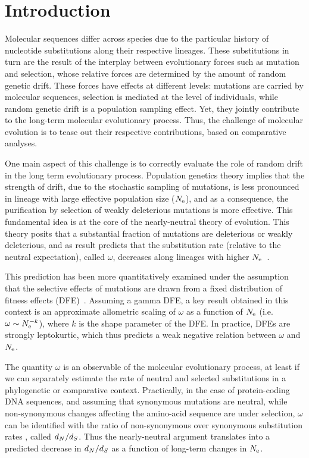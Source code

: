 \section{Introduction}

Molecular sequences differ across species due to the particular history of nucleotide substitutions along their respective lineages.
These substitutions in turn are the result of the interplay between evolutionary forces such as mutation and selection, whose relative forces are determined by the amount of random genetic drift.
These forces have effects at different levels: mutations are carried by molecular sequences, selection is mediated at the level of individuals, while random genetic drift is a population sampling effect.
Yet, they jointly contribute to the long-term molecular evolutionary process.
Thus, the challenge of molecular evolution is to tease out their respective contributions, based on comparative analyses.

One main aspect of this challenge is to correctly evaluate the role of random drift in the long term evolutionary process.
Population genetics theory implies that the strength of drift, due to the stochastic sampling of mutations, is less pronounced in lineage with large effective population size ($N_{\text{e}}$), and as a consequence, the purification by selection of weakly deleterious mutations is more effective.
This fundamental idea is at the core of the nearly-neutral theory of evolution.
This theory posits that a substantial fraction of mutations are deleterious or weakly deleterious, and as result predicts that the substitution rate (relative to the neutral expectation), called $\omega$, decreases along lineages with higher $N_{\text{e}}$~\citep{Ohta1972, Ohta1992}.

This prediction has been more quantitatively examined under the assumption that the selective effects of mutations are drawn from a fixed distribution of fitness effects (\acrshort{DFE})~\citep{Kimura1979, Welch2008}.
Assuming a gamma \acrshort{DFE}, a key result obtained in this context is an approximate allometric scaling of $\omega$ as a function of $N_{\text{e}}$ (i.e. $\omega \sim N_{\text{e}}^{-k}$), where $k$ is the shape parameter of the \acrshort{DFE}.
In practice, DFEs are strongly leptokurtic, which thus predicts a weak negative relation between $\omega$ and $N_{\text{e}}$.

The quantity $\omega$ is an observable of the molecular evolutionary process, at least if we can separately estimate the rate of neutral and selected substitutions in a phylogenetic or comparative context.
Practically, in the case of protein-coding \acrshort{DNA} sequences, and assuming that synonymous mutations are neutral, while non-synonymous changes affecting the amino-acid sequence are under selection, $\omega$ can be identified with the ratio of non-synonymous over synonymous substitution rates , called $d_N / d_S$.
Thus the nearly-neutral argument translates into a predicted decrease in $d_N / d_S$ as a function of long-term changes in $N_{\text{e}}$.

